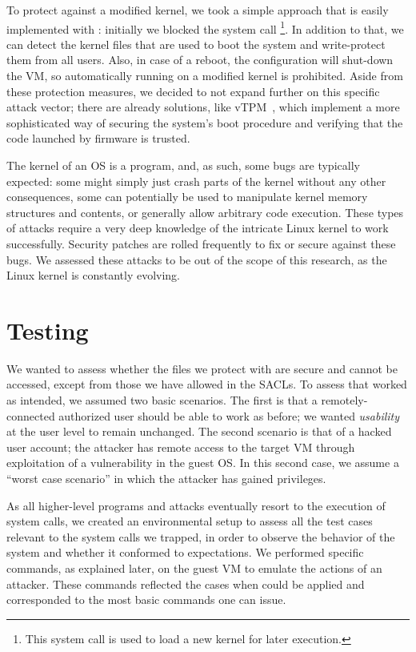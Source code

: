\par To protect against a modified kernel, we took a simple approach that is easily implemented with : initially we blocked the system call \footnote{This system call is used to load a new kernel for later execution.}. In addition to that, we can detect the kernel files that are used to boot the system and write-protect them from all users. Also, in case of a reboot, the configuration will shut-down the \ac{VM}, so automatically running on a modified kernel is prohibited. Aside from these protection measures, we decided to not expand further on this specific attack vector; there are already solutions, like vTPM~\cite{perez2006vtpm}, which implement a more sophisticated way of securing the system's boot procedure and verifying that the code launched by firmware is trusted. 

\par The kernel of an \ac{OS} is a program, and, as such, some bugs are typically expected: some might simply just crash parts of the kernel without any other consequences, some can potentially be used to manipulate kernel memory structures and contents, or generally allow arbitrary code execution. These types of attacks require a very deep knowledge of the intricate Linux kernel to work successfully. Security patches are rolled frequently to fix or secure against these bugs. We assessed these attacks to be out of the scope of this research, as the Linux kernel is constantly evolving. 

\section{Testing}\label{sec:testing}

\par We wanted to assess whether the files we protect with  are secure and cannot be accessed, except from those we have allowed in the \acp{SACL}. To assess that  worked as intended, we assumed two basic scenarios. The first is that a remotely-connected authorized user should be able to work as before; we wanted \emph{usability} at the user level to remain unchanged. The second scenario is that of a hacked user account; the attacker has remote access to the target \ac{VM} through exploitation of a vulnerability in the guest \ac{OS}. In this second case, we assume a ``worst case scenario'' in which the attacker has gained  privileges. 

\par As all higher-level programs and attacks eventually resort to the execution of  system calls, we created an environmental setup to assess all the test cases relevant to the system calls we trapped, in order to observe the behavior of the system and whether it conformed to expectations. We performed specific commands, as explained later, on the guest \ac{VM} to emulate the actions of an attacker. These commands reflected the cases when  could be applied and corresponded to the most basic commands one can issue. 

